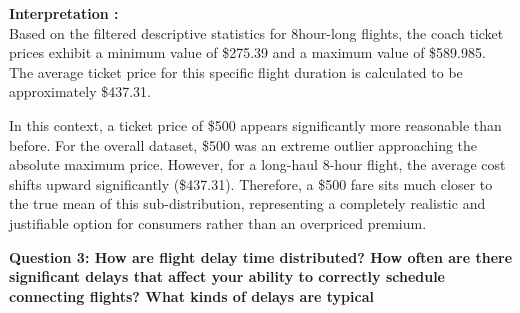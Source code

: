 \documentclass[11pt,a4paper]{article}
\begin{document}
\noindent \textbf{Interpretation :} \\
Based on the filtered descriptive statistics for 8\-hour-long flights, the coach ticket prices exhibit a minimum value of \$275.39 and a maximum value of \$589.985. The average ticket price for this specific flight duration is calculated to be approximately \$437.31. 

In this context, a ticket price of \$500 appears significantly more reasonable than before. For the overall dataset, \$500 was an extreme outlier approaching the absolute maximum price. However, for a long-haul 8-hour flight, the average cost shifts upward significantly (\$437.31). Therefore, a \$500 fare sits much closer to the true mean of this sub-distribution, representing a completely realistic and justifiable option for consumers rather than an overpriced premium.
\vspace{2.5em}

\noindent \textbf{\large Question 3:
How are flight delay time distributed? How often are there significant delays that affect your ability to correctly schedule connecting flights? What kinds of delays are typical}
\end{document}

